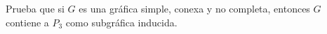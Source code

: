 Prueba que si $G$ es una gráfica simple, conexa y no completa, entonces
$G$ contiene a $P_3$ como subgráfica inducida.


